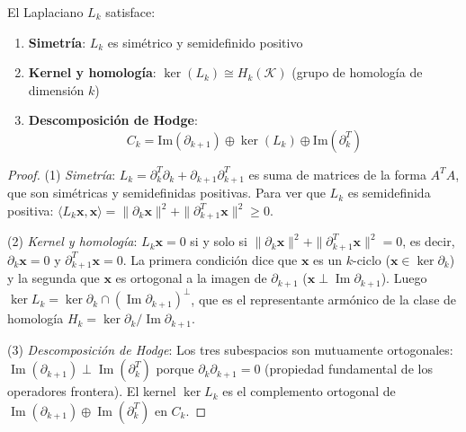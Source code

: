 \begin{theorem}\label{thm:prop_hodge_laplacian}
El Laplaciano $L_k$ satisface:
\begin{enumerate}
    \item \textbf{Simetría}: $L_k$ es simétrico y semidefinido positivo
    \item \textbf{Kernel y homología}: $\ker(L_k) \cong H_k(\mathcal{K})$ (grupo de homología de dimensión $k$)
    \item \textbf{Descomposición de Hodge}:
    \[C_k = \text{Im}(\partial_{k+1}) \oplus \ker(L_k) \oplus \text{Im}(\partial_k^T)\]
\end{enumerate}
\end{theorem}

\begin{proof}
(1) \textit{Simetría}: $L_k = \partial_k^T \partial_k + \partial_{k+1} \partial_{k+1}^T$ es suma de matrices de la forma $A^T A$, que son simétricas y semidefinidas positivas. Para ver que $L_k$ es semidefinida positiva: $\langle L_k \mathbf{x}, \mathbf{x} \rangle = \|\partial_k \mathbf{x}\|^2 + \|\partial_{k+1}^T \mathbf{x}\|^2 \geq 0$.

(2) \textit{Kernel y homología}: $L_k \mathbf{x} = 0$ si y solo si $\|\partial_k \mathbf{x}\|^2 + \|\partial_{k+1}^T \mathbf{x}\|^2 = 0$, es decir, $\partial_k \mathbf{x} = 0$ y $\partial_{k+1}^T \mathbf{x} = 0$. La primera condición dice que $\mathbf{x}$ es un $k$-ciclo ($\mathbf{x} \in \ker \partial_k$) y la segunda que $\mathbf{x}$ es ortogonal a la imagen de $\partial_{k+1}$ ($\mathbf{x} \perp \operatorname{Im} \partial_{k+1}$). Luego $\ker L_k = \ker \partial_k \cap (\operatorname{Im} \partial_{k+1})^\perp$, que es el representante armónico de la clase de homología $H_k = \ker \partial_k / \operatorname{Im} \partial_{k+1}$.

(3) \textit{Descomposición de Hodge}: Los tres subespacios son mutuamente ortogonales: $\operatorname{Im}(\partial_{k+1}) \perp \operatorname{Im}(\partial_k^T)$ porque $\partial_k \partial_{k+1} = 0$ (propiedad fundamental de los operadores frontera). El kernel $\ker L_k$ es el complemento ortogonal de $\operatorname{Im}(\partial_{k+1}) \oplus \operatorname{Im}(\partial_k^T)$ en $C_k$.
\end{proof}

